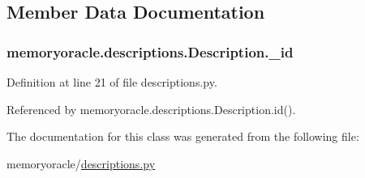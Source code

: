 \subsection{Member Data Documentation}
\hypertarget{classmemoryoracle_1_1descriptions_1_1Description_a75740a1e65e4640ddd011d2c98aad5c3}{}
\subsubsection[{\+\_\+id}]{\setlength{\rightskip}{0pt plus 5cm}memoryoracle.\+descriptions.\+Description.\+\_\+id\hspace{0.3cm}{\ttfamily [private]}}\label{classmemoryoracle_1_1descriptions_1_1Description_a75740a1e65e4640ddd011d2c98aad5c3}


Definition at line 21 of file descriptions.\+py.



Referenced by memoryoracle.\+descriptions.\+Description.\+id().



The documentation for this class was generated from the following file\+:\begin{DoxyCompactItemize}
\item 
memoryoracle/\hyperlink{descriptions_8py}{descriptions.\+py}\end{DoxyCompactItemize}
